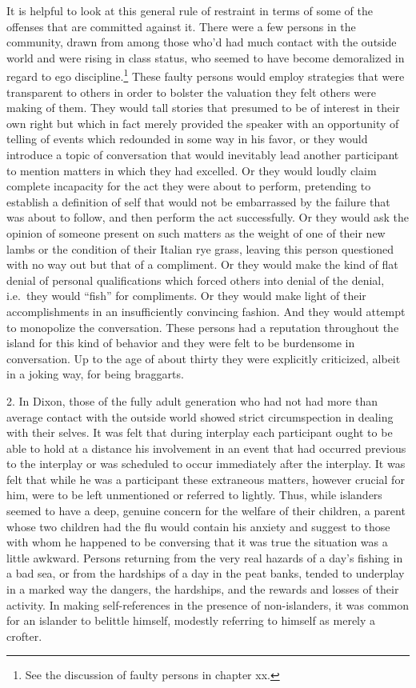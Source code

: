 \documentclass[twoside,symmetric,nobib,justified]{tufte-book}
\begin{document}
It is helpful to look at this general rule of restraint in terms of some
of the offenses that are committed against it. There were a few persons
in the community, drawn from among those who'd had much contact with the
outside world and were rising in class status, who seemed to have become
demoralized in regard to ego discipline.\footnote{See the discussion of
  faulty persons in chapter xx.} These faulty persons would employ
strategies that were transparent to others in order to bolster the
valuation they felt others were making of them. They would tall stories
that presumed to be of interest in their own right but which in fact
merely provided the speaker with an opportunity of telling of events
which redounded in some way in his favor, or they would introduce a
topic of conversation that would inevitably lead another participant to
mention matters in which they had excelled. Or they would loudly claim
complete incapacity for the act they were about to perform, pretending
to establish a definition of self that would not be embarrassed by the
failure that was about to follow, and then perform the act successfully.
Or they would ask the opinion of someone present on such matters as the
weight of one of their new lambs or the condition of their Italian rye
grass, leaving this person questioned with no way out but that of a
compliment. Or they would make the kind of flat denial of personal
qualifications which forced others into denial of the denial, i.e.~they
would ``fish'' for compliments. Or they would make light of their
accomplishments in an insufficiently convincing fashion. And they would
attempt to monopolize the conversation. These persons had a reputation
throughout the island for this kind of behavior and they were felt to be
burdensome in conversation. Up to the age of about thirty they were
explicitly criticized, albeit in a joking way, for being braggarts.

2. In Dixon, those of the fully adult generation who had not had more
than average contact with the outside world showed strict circumspection
in dealing with their selves. It was felt that during interplay each
participant ought to be able to hold at a distance his involvement in an
event that had occurred previous to the interplay or was scheduled to
occur immediately after the interplay. It was felt that while he was a
participant these extraneous matters, however crucial for him, were to
be left unmentioned or referred to lightly. Thus, while islanders seemed
to have a deep, genuine concern for the welfare of their children, a
parent whose two children had the flu would contain his anxiety and
suggest to those with whom he happened to be conversing that it was true
the situation was a little awkward. Persons returning from the very real
hazards of a day's fishing in a bad sea, or from the hardships of a day
in the peat banks, tended to underplay in a marked way the dangers, the
hardships, and the rewards and losses of their activity. In making
self-references in the presence of non-islanders, it was common for an
islander to belittle himself, modestly referring to himself as merely a
crofter.
\end{document}
